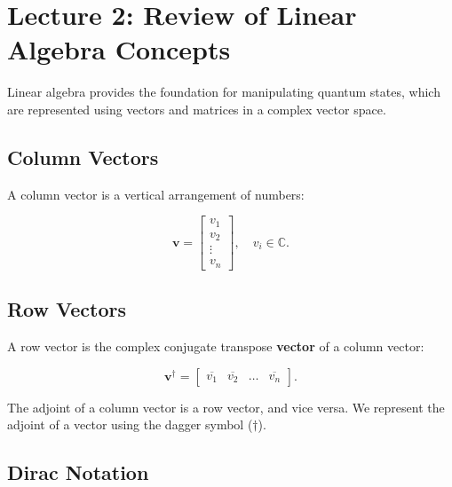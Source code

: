 \section{Lecture 2: Review of Linear Algebra Concepts}\label{sec:lecture2}

Linear algebra provides the foundation for manipulating quantum states, which
are represented using vectors and matrices in a complex vector space.


\subsection*{Column Vectors} 

A column vector is a vertical arrangement of numbers:

\[
  \mathbf{v} =
  \begin{bmatrix}
    v_1 \\
    v_2 \\
    \vdots \\
    v_n
  \end{bmatrix}, \quad v_i \in \mathbb{C}.
\]

\subsection*{Row Vectors}

A row vector is the complex conjugate transpose \textbf{vector}
 of a column vector:

\[
  \mathbf{v}^\dagger =
  \begin{bmatrix}
    \overline{v_1} & \overline{v_2} & \dots & \overline{v_n}
  \end{bmatrix}.
\]

The adjoint of a column vector is a row vector, and vice versa. We represent
the adjoint of a vector using the dagger symbol ($\dagger$).

\subsection*{Dirac Notation }

